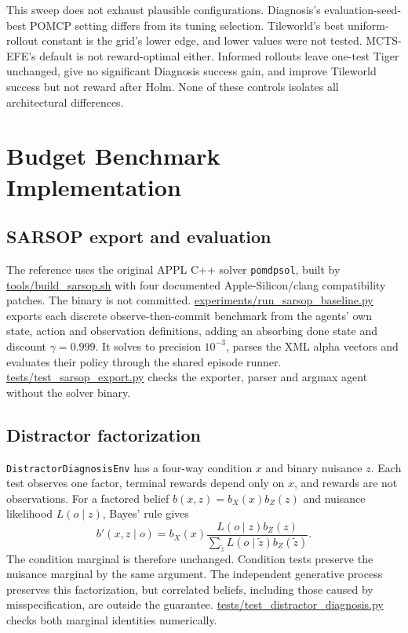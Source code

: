 \documentclass[manuscript, screen, review]{jair}
\begin{document}
This sweep does not exhaust plausible configurations. Diagnosis's evaluation-seed-best POMCP setting differs from its tuning selection. Tileworld's best uniform-rollout constant is the grid's lower edge, and lower values were not tested. MCTS-EFE's default is not reward-optimal either. Informed rollouts leave one-test Tiger unchanged, give no significant Diagnosis success gain, and improve Tileworld success but not reward after Holm. None of these controls isolates all architectural differences.

\FloatBarrier

\section{Budget Benchmark Implementation}
\label{app:budget_supp}

\subsection{SARSOP export and evaluation}
\label{app:sarsop_build}

The reference uses the original APPL C++ solver \texttt{pomdpsol}, built by \url{tools/build_sarsop.sh} with four documented Apple-Silicon/clang compatibility patches. The binary is not committed. \url{experiments/run_sarsop_baseline.py} exports each discrete observe-then-commit benchmark from the agents' own state, action and observation definitions, adding an absorbing done state and discount $\gamma=0.999$. It solves to precision $10^{-3}$, parses the XML alpha vectors and evaluates their policy through the shared episode runner. \url{tests/test_sarsop_export.py} checks the exporter, parser and argmax agent without the solver binary.

\subsection{Distractor factorization}
\label{app:distractor}

\texttt{DistractorDiagnosisEnv} has a four-way condition $x$ and binary nuisance $z$. Each test observes one factor, terminal rewards depend only on $x$, and rewards are not observations. For a factored belief $b(x,z)=b_X(x)b_Z(z)$ and nuisance likelihood $L(o\mid z)$, Bayes' rule gives
\[
b'(x,z\mid o)=b_X(x)\frac{L(o\mid z)b_Z(z)}{\sum_{\tilde z}L(o\mid\tilde z)b_Z(\tilde z)}.
\]
The condition marginal is therefore unchanged. Condition tests preserve the nuisance marginal by the same argument. The independent generative process preserves this factorization, but correlated beliefs, including those caused by misspecification, are outside the guarantee. \url{tests/test_distractor_diagnosis.py} checks both marginal identities numerically.
\end{document}
